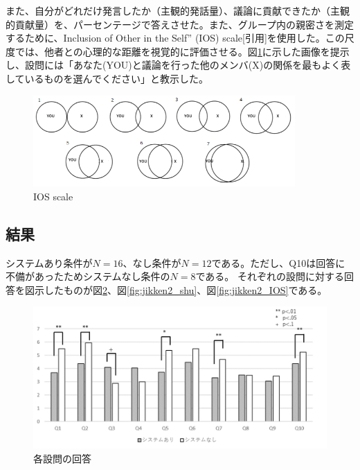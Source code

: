 \documentclass[11pt, a4paper]{jreport} %
\begin{document}
また、自分がどれだけ発言したか（主観的発話量）、議論に貢献できたか（主観的貢献量）を、パーセンテージで答えさせた。また、グループ内の親密さを測定するために、Inclusion of Other in the Self” (IOS) scale[引用]を使用した。この尺度では、他者との心理的な距離を視覚的に評価させる。図\ref{fig:IOS}に示した画像を提示し、設問には「あなた(YOU)と議論を行った他のメンバ(X)の関係を最もよく表しているものを選んでください」と教示した。

\begin{figure}[htbp]
\begin{center}
\includegraphics[width=100mm]{images/IOS}
\caption{IOS scale}
\label{fig:IOS}
\end{center}
\end{figure}

\subsection{結果}
システムあり条件が$N=16$、なし条件が$N=12$である。ただし、Q10は回答に不備があったためシステムなし条件の$N=8$である。
それぞれの設問に対する回答を図示したものが図\ref{fig:jikken2_kobetu}、図\ref{fig:jikken2_shu}、図\ref{fig:jikken2_IOS}である。

\begin{figure}[htbp]
\begin{center}
\includegraphics[width=150mm]{images/jikken2_kobetu}
\caption{各設問の回答}
\label{fig:jikken2_kobetu}
\end{center}
\end{figure}
\end{document}
